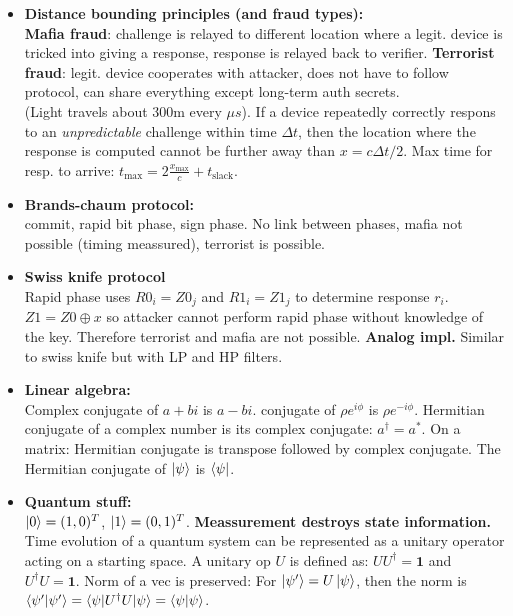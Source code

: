\documentclass[twocolumn,9pt]{extarticle}
\begin{document}
\begin{itemize}

	\item \textbf{Distance bounding principles (and fraud types): } \\
	\textbf{Mafia fraud}: challenge is relayed to different location where a legit. device is tricked into giving a response, response is relayed back to verifier.
	\textbf{Terrorist fraud}: legit. device cooperates with attacker, does not have to follow protocol, can share everything except long-term auth secrets.\\
	(Light travels about 300m every $\mu s$). If a device repeatedly correctly respons to an \emph{unpredictable} challenge within time $\Delta t$, then the location where the response is computed cannot be further away than $x = c \Delta t/2$. Max time for resp. to arrive: $t_{\text{max}} = 2 \frac{x_{\text{max}}}{c} + t_{\text{slack}}$. 

	\item \textbf{Brands-chaum protocol: } \\
	commit, rapid bit phase, sign phase. No link between phases, mafia not possible (timing meassured), terrorist is possible.
	\item \textbf{Swiss knife protocol } \\
	Rapid phase uses $R0_i=Z0_j$ and $R1_i=Z1_j$ to determine response $r_i$. $Z1 = Z0 \oplus x$ so attacker cannot perform rapid phase without knowledge of the key. Therefore terrorist and mafia are not possible. \textbf{Analog impl.} Similar to swiss knife but with LP and HP filters.


	\item \textbf{Linear algebra:} \\
	Complex conjugate of $a+bi$ is $a-bi$. conjugate of $\rho e^{i \phi}$ is $\rho e^{-i \phi}$. Hermitian conjugate of a complex number is its complex conjugate: $a^\dagger = a^*$.
	On a matrix: Hermitian conjugate is transpose followed by complex conjugate.
	The Hermitian conjugate of $\ket{\psi}$ is $\bra{\psi}$.

	\item \textbf{Quantum stuff:} \\
	$\ket{0} = (1,0)^T$, $\ket{1} = (0,1)^T$. 
	\textbf{Meassurement destroys state information.}\\
	Time evolution of a quantum system can be represented as a unitary operator acting on a starting space. A unitary op $U$ is defined as: $UU^\dagger = \mathbf{1}$ and $U^\dagger U = \mathbf{1}$. Norm of a vec is preserved: For $\ket{\psi'} = U\ket{\psi}$, then the norm is $\braket{\psi'|\psi'} = \braket{\psi|U^\dagger U|\psi} = \braket{\psi|\psi}$.


\end{itemize}
\end{document}
